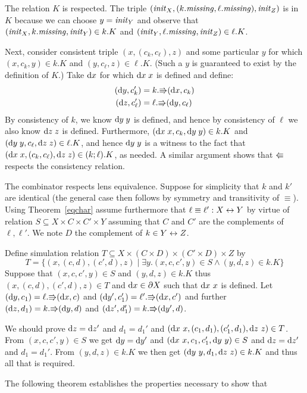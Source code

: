 \begin{pf}
  The relation $K$ is respected. The triple
  $(\mathit{init}_X,(k.\mathit{missing},\ell.\mathit{missing}),\mathit{init}_Z)$ is in $K$ because we can
  choose $y=\mathit{init}_Y$ and observe that $(\mathit{init}_X,k.\mathit{missing},\mathit{init}_Y)\in k.K$
  and $(\mathit{init}_Y,\ell.\mathit{missing},\mathit{init}_Z)\in\ell.K$.

  Next, consider consistent triple $(x,(c_k,c_\ell),z)$ and some particular
  $y$ for which $(x,c_k,y) \in k.K$ and $(y,c_\ell,z)\in\ell.K$. (Such a $y$
  is guaranteed to exist by the definition of $K$.) Take $\textrm{d} x$ for which
  $\textrm{d} x\;x$ is defined and define:
  \begin{align*}
      (\textrm{d} y,c_k') &= k.\mathord{\Rrightarrow}(\textrm{d} x,c_k) \\
      (\textrm{d} z,c_\ell') &= \ell.\mathord{\Rrightarrow}(\textrm{d} y,c_\ell)
  \end{align*}
  By consistency of $k$, we know $\textrm{d} y\;y$ is defined, and hence by
  consistency of $\ell$ we also know $\textrm{d} z\;z$ is defined. Furthermore,
  $(\textrm{d} x\;x,c_k,\textrm{d} y\;y) \in k.K$ and $(\textrm{d} y\;y,c_\ell,\textrm{d} z\;z) \in \ell.K$, and
  hence $\textrm{d} y\;y$ is a witness to the fact that $(\textrm{d} x\;x,(c_k,c_\ell),\textrm{d} z\;z)
  \in (k;\ell).K$, as needed. A similar argument shows that $\mathord{\Lleftarrow}$
  respects the consistency relation.

  The combinator respects lens equivalence.
  Suppose for simplicity that $k$ and $k'$ are identical (the general case then follows by symmetry and transitivity of $\equiv$). Using Theorem~\ref{eqchar} assume furthermore that $\ell\equiv \ell': X\leftrightarrow Y$ 
by virtue of relation $S\subseteq X\times
  C\times C'\times Y$ assuming that $C$ and $C'$ are the complements of
  $\ell,\ell'$. We note $D$ the complement of $k\in Y\leftrightarrow Z$. 

  Define simulation relation $T\subseteq X\times (C\times D)\times (C'\times D)\times Z$ by
\[
T = \{(x,(c,d),(c',d),z)\mid \exists y. (x,c,c',y)\in S \wedge (y,d,z)\in k.K\}
\]
Suppose that $(x,c,c',y)\in S$ and $(y,d,z)\in k.K$ thus $(x,(c,d),(c',d),z)\in T$ and 
$\textrm{d} x\in \partial X$ such that $\textrm{d} x\ x$ is defined. 
Let $(\textrm{d} y,c_1)=\ell.\mathord{\Rrightarrow}(\textrm{d} x,c)$ and $(\textrm{d} y',c_1')=\ell'.\mathord{\Rrightarrow}(\textrm{d} x,c')$ and further 
$(\textrm{d} z,d_1)=k.\mathord{\Rrightarrow}(\textrm{d} y,d)$ and  $(\textrm{d} z',d_1')=k.\mathord{\Rrightarrow}(\textrm{d} y',d)$. 

We should prove $\textrm{d} z=\textrm{d} z'$ and $d_1=d_1'$ and $(\textrm{d} x\
x,(c_1,d_1),(c_1',d_1),\textrm{d} z\ z)\in T$.  From $(x,c,c',y)\in S$ we get
$\textrm{d} y=\textrm{d} y'$ and $(\textrm{d} x\ x,c_1,c_1',\textrm{d} y\ y)\in S$ and $\textrm{d} z=\textrm{d} z'$ and
$d_1=d_1'$.  From $(y,d,z)\in k.K$ we then get $(\textrm{d} y\ y,d_1,\textrm{d} z\ z)\in
k.K$ and thus all that is required. 
\end{pf}
The following theorem establishes the properties necessary to show that
